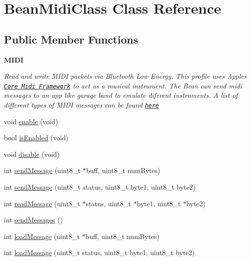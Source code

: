 \hypertarget{class_bean_midi_class}{}\section{Bean\+Midi\+Class Class Reference}
\label{class_bean_midi_class}
\subsection*{Public Member Functions}
\begin{Indent}{\bf M\+I\+D\+I}\par
{\em Read and write M\+I\+D\+I packets via Bluetooth Low Energy. This profile uses Apple\textquotesingle{}s \href{https://developer.apple.com/library/ios/documentation/MusicAudio/Reference/CACoreMIDIRef/index.html}{\tt Core Midi Framework} to act as a musical instrument. The Bean can send midi messages to an app like garage band to emulate diferent instruments. A list of different types of M\+I\+D\+I messages can be found \href{https://www.midi.org/specifications/item/table-1-summary-of-midi-message}{\tt here} }\begin{DoxyCompactItemize}
\item 
void \hyperlink{class_bean_midi_class_a526f499963ba700b7b3605ad5c583f8a}{enable} (void)
\item 
bool \hyperlink{class_bean_midi_class_acfb35f85288cf76b4a69615a7c2f7c65}{is\+Enabled} (void)
\item 
void \hyperlink{class_bean_midi_class_acaede888f073a393a35170571ff7a907}{disable} (void)
\item 
int \hyperlink{class_bean_midi_class_a6aa7b50926b79b300f0432f249714bbe}{send\+Message} (uint8\+\_\+t $\ast$buff, uint8\+\_\+t num\+Bytes)
\item 
int \hyperlink{class_bean_midi_class_a933dfbfd846731f38fc5fbb11ee7c697}{send\+Message} (uint8\+\_\+t status, uint8\+\_\+t byte1, uint8\+\_\+t byte2)
\item 
int \hyperlink{class_bean_midi_class_a93453d829ea9cc9814b29358c7214e44}{read\+Message} (uint8\+\_\+t $\ast$status, uint8\+\_\+t $\ast$byte1, uint8\+\_\+t $\ast$byte2)
\item 
int \hyperlink{class_bean_midi_class_a22ea30a681afb82addbd7b5c9e2106c4}{send\+Messages} ()
\item 
int \hyperlink{class_bean_midi_class_a9a7e91ea694b3e66ddc651afedbc5486}{load\+Message} (uint8\+\_\+t $\ast$buff, uint8\+\_\+t num\+Bytes)
\item 
int \hyperlink{class_bean_midi_class_a310c0bcc3934390f5776b06425e672aa}{load\+Message} (uint8\+\_\+t status, uint8\+\_\+t byte1, uint8\+\_\+t byte2)

\end{DoxyCompactItemize}
\end{Indent}
